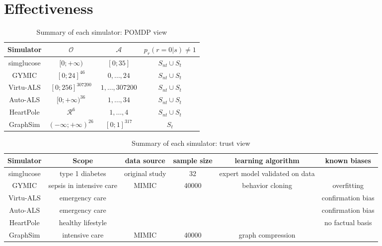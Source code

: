 \section{Effectiveness}
\label{sec:effectiveness}

\begin{table}[]
    \centering
    \begin{tabular}{c|c|c|c}
         Simulator & $\mathcal{O} $ & $\mathcal{A}$ & $p_r(r=0|s) \neq 1$ \\
         \midrule
         simglucose & $[0;+\infty)$ & $[0;35]$ & $S_{nt} \cup S_t$ \\
         GYMIC & $[0;24]^{46}$ & $0,\dots,24$ & $S_{nt} \cup S_t$ \\
         Virtu-ALS & $[0;256]^{307200}$ & $1,\dots,307200$ & $S_{nt} \cup S_t$ \\
         Auto-ALS & $[0;+\infty)^{36}$ & $1,\dots,34$ & $S_{nt} \cup S_t$ \\
         HeartPole & $\mathcal{R}^6$ & $1,\dots,4$ & $S_{nt} \cup S_t$ \\
         GraphSim & $(-\infty;+\infty)^{26}$ & $[0;1]^{317}$ & $S_t$ \\
    \end{tabular}
    \caption{Summary of each simulator: POMDP view}
    \label{tab:structview}
\end{table}

\begin{table*}[]
    \centering
    \begin{tabular}{c|c|c|c|c|c}
         Simulator & Scope & data source & sample size & learning algorithm & known biases \\
         \midrule
         simglucose \cite{simglucose} & type 1 diabetes & original study & 32 & expert model validated on data & \\
         GYMIC \cite{gymic} & sepsis in intensive care & MIMIC \cite{mimic} & 40000 & behavior cloning & overfitting \\
         Virtu-ALS \cite{virtu-als} & emergency care & & & & confirmation bias \\
         Auto-ALS & emergency care & & & & confirmation bias \\
         HeartPole & healthy lifestyle & & & & no factual basis \\
         GraphSim & intensive care & MIMIC \cite{mimic} & 40000 & graph compression & \\
    \end{tabular}
    \caption{Summary of each simulator: trust view}
    \label{tab:trustview}
\end{table*}

